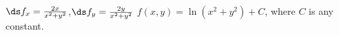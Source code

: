 {$\ds f_x = \frac{2x}{x^2+y^2}$,\quad $\ds f_y = \frac{2y}{x^2+y^2}$}
{$f(x,y) = \ln (x^2+y^2)+ C$, where $C$ is any constant.
}
